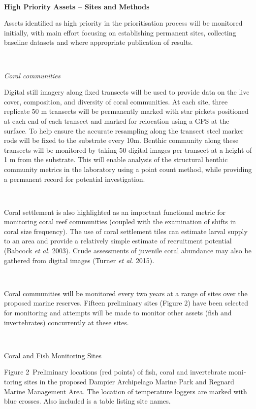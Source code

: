 \documentclass[version=last,
    paper=a4,                               %
    10pt,                                   %
    dvipsnames,
    oneside,                              %
    headings=openany,                       %
    open=any,
    BCOR=7mm,                               %
    DIV=15,     %
]{scrbook}
\begin{document}
~

\textbf{High Priority Assets -- Sites and Methods}

Assets identified as high priority in the prioritisation process will be
monitored initially, with main effort focusing on establishing permanent
sites, collecting baseline datasets and where appropriate publication of
results.

~

\emph{Coral communities}

Digital still imagery along fixed transects will be used to provide data
on the live cover, composition, and diversity of coral communities. At
each site, three replicate 50 m transects will be permanently marked
with star pickets positioned at each end of each transect and marked for
relocation using a GPS at the surface. To help ensure the accurate
resampling along the transect steel marker rods will be fixed to the
substrate every 10m. Benthic community along these transects will be
monitored by taking 50 digital images per transect at a height of 1 m
from the substrate. This will enable analysis of the structural benthic
community metrics in the laboratory using a point count method, while
providing a permanent record for potential investigation.

~

Coral settlement is also highlighted as an important functional metric
for monitoring coral reef communities (coupled with the examination of
shifts in coral size frequency). The use of coral settlement tiles can
estimate larval supply to an area and provide a relatively simple
estimate of recruitment potential (Babcock \emph{et al.} 2003). Crude
assessments of juvenile coral abundance may also be gathered from
digital images (Turner \emph{et al.} 2015).

~

Coral communities will be monitored every two years at a range of sites
over the proposed marine reserves. Fifteen preliminary sites (Figure 2)
have been selected for monitoring and attempts will be made to monitor
other assets (fish and invertebrates) concurrently at these sites.

~

\href{http://internal-data.dpaw.wa.gov.au/dataset/4afb0762-81ee-4d29-aa12-2728f725d85d/resource/0e66905a-8fe6-4099-b2f8-ddb2058d03e8/download/figure-2.pdf}{Coral
and Fish Monitoring Sites}

Figure 2~\textenglish[variant=american]{Preliminary locations (red
points) of fish, coral and invertebrate monitoring sites in the proposed
Dampier Archipelago Marine Park and Regnard Marine Management Area. The
location of temperature loggers are marked with blue crosses. Also
included is a table listing site names.}
\end{document}
